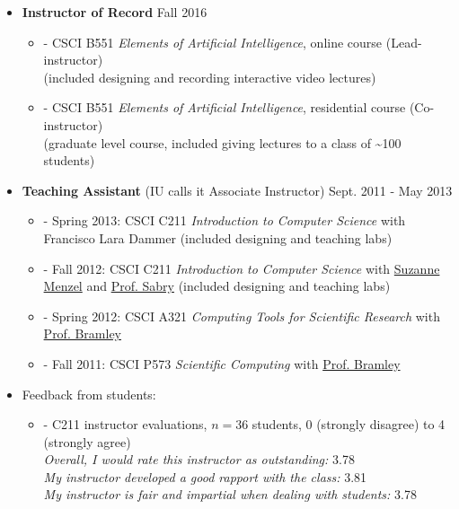 \documentclass[10pt]{article}
\newenvironment{outerlist}[1][\enskip\textbullet]%
        {\begin{itemize}[#1,leftmargin=*,parsep=5pt,itemsep=0pt,topsep=0pt,partopsep=0pt]}{\end{itemize}%
         \vspace{-.6\baselineskip}}
\newenvironment{innerlist}[1][\enskip\textbullet]%
        {\begin{itemize}[#1,leftmargin=*,parsep=0pt,itemsep=3pt,topsep=-2pt,partopsep=0pt]}
        {\end{itemize}}
\begin{document}
\begin{outerlist}

    \item \textbf{Instructor of Record} \hfill Fall 2016

    \begin{innerlist}
        \item[-] CSCI B551 \emph{Elements of Artificial Intelligence}, online course (Lead-instructor)\\
        (included designing and recording interactive video lectures)
        \item[-] CSCI B551 \emph{Elements of Artificial Intelligence}, residential course (Co-instructor)\\
        (graduate level course, included giving lectures to a class of \textasciitilde 100 students)
    \end{innerlist}

    \item \textbf{Teaching Assistant} (IU calls it Associate Instructor) \hfill Sept. 2011 - May 2013
   
    \begin{innerlist}
        \item[-] Spring 2013: CSCI C211 \emph{Introduction to Computer Science} with Francisco Lara Dammer (included designing and teaching labs)
        \item[-] Fall 2012: CSCI C211 \emph{Introduction to Computer Science} with \href{http://www.cs.indiana.edu/~menzel/}{Suzanne Menzel} and \href{http://www.cs.indiana.edu/~sabry/}{Prof. Sabry} (included designing and teaching labs)
        \item[-] Spring 2012: CSCI A321 \emph{Computing Tools for Scientific Research} with \href{http://www.cs.indiana.edu/~bramley/}{Prof. Bramley}
        \item[-] Fall 2011: CSCI P573 \emph{Scientific Computing} with \href{http://www.cs.indiana.edu/~bramley/}{Prof. Bramley}

    \end{innerlist}

    \item Feedback from students:

    \begin{innerlist}

        \item[-] C211 instructor evaluations, $n=36$ students, 0 (strongly disagree) to 4 (strongly agree)\\
        \emph{Overall, I would rate this instructor as outstanding:} 3.78\\
        \emph{My instructor developed a good rapport with the class:} 3.81\\
        \emph{My instructor is fair and impartial when dealing with students:} 3.78

    \end{innerlist}


\end{outerlist}
\end{document}
